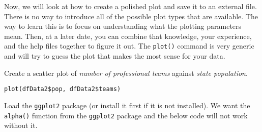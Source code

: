 Now, we will look at how to create a polished plot and save it to an
external file. There is no way to introduce all of the possible plot
types that are available. The way to learn this is to focus on
understanding what the plotting parameters mean. Then, at a later
date, you can combine that knowledge, your experience, and the \R{}
help files together to figure it out. The \texttt{plot()} command is
very generic and will try to guess the plot that makes the most sense
for your data.

Create a scatter plot of \textit{number of professional teams} against
\textit{state population}.
\begin{verbatim}
plot(dfData2$pop, dfData2$teams)
\end{verbatim}

Load the \texttt{ggplot2} package (or install it first if it is not
installed). We want the \texttt{alpha()} function from the
\texttt{ggplot2} package and the below code will not work without it.

